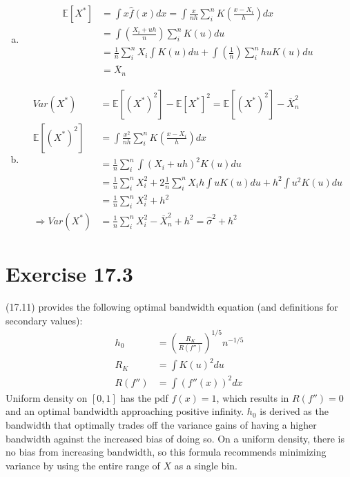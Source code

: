 \documentclass{article}
\newcommand{\olx}[1]{\overline{X}_{#1}}
\newcommand{\E}[1]{\mathbb{E}\left[#1\right]}%
\begin{document}
\begin{enumerate}[(a)]
	\item 
		\begin{align*}
			\E{X^*}	&= \int x\hat{f}(x)dx = \int\frac{x}{nh}\sum_{i}^nK\left(\frac{x-X_i}{h}\right)dx					\\
					&= \int\left(\frac{X_i+uh}{n}\right)\sum_{i}^nK(u)du 												\\
					&= \frac{1}{n}\sum_{i}^nX_i\int K(u)du + \int\left(\frac{1}{n}\right)\sum_{i}^nhuK(u)du		\\
					&= \olx{n}
		\end{align*}
	
	\item 
		\begin{align*}
			Var(X^*)	&= \E{(X^*)^2} - \E{X^*}^2 = \E{(X^*)^2} - \olx{n}^2										\\
			\E{(X^*)^2}	&= \int\frac{x^2}{nh}\sum_{i}^nK\left(\frac{x-X_i}{h}\right)dx								\\
						&= \frac{1}{n}\sum_{i}^n\int(X_i+uh)^2K(u)du												\\
						&= \frac{1}{n}\sum_{i}^nX_i^2 + 2\frac{1}{n}\sum_{i}^nX_ih\int uK(u)du + h^2\int u^2K(u)du	\\
						&= \frac{1}{n}\sum_{i}^nX_i^2+ h^2															\\
   \Rightarrow Var(X^*) &= \frac{1}{n}\sum_{i}^nX_i^2 - \olx{n}^2+ h^2	 = \hat{\sigma}^2 + h^2
		\end{align*}
	
\end{enumerate}


\section*{Exercise 17.3}
(17.11) provides the following optimal bandwidth equation (and definitions for secondary values):
\begin{align*}
	h_0		&= \left(\frac{R_K}{R(f'')}\right)^{1/5}n^{-1/5} 	\\
	R_K 	&= \int K(u)^2du									\\
	R(f'') 	&= \int\left(f''(x)\right)^2dx
\end{align*}
Uniform density on $[0,1]$ has the pdf $f(x)=1$, which results in ${R(f'')=0}$ and an optimal bandwidth approaching positive infinity. $h_0$ is derived as the bandwidth that optimally trades off the variance gains of having a higher bandwidth against the increased bias of doing so. On a uniform density, there is no bias from increasing bandwidth, so this formula recommends minimizing variance by using the entire range of $X$ as a single bin.
\end{document}
